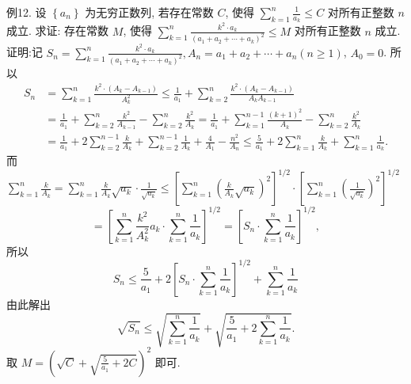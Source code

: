 例12. 设 $\left\{a_n\right\}$ 为无穷正数列, 若存在常数 $C$, 使得 $\sum_{k=1}^n \frac{1}{a_k} \leqslant C$ 对所有正整数 $n$ 成立.
求证: 存在常数 $M$, 使得 $\sum_{k=1}^n \frac{k^2 \cdot a_k}{\left(a_1+a_2+\cdots+a_k\right)^2} \leqslant M$ 对所有正整数 $n$ 成立.
证明:记 $S_n=\sum_{k=1}^n \frac{k^2 \cdot a_k}{\left(a_1+a_2+\cdots+a_k\right)^2}, A_n=a_1+a_2+\cdots+a_n(n \geqslant 1)$, $A_0=0$. 所以
$$
\begin{aligned}
S_n & =\sum_{k=1}^n \frac{k^2 \cdot\left(A_k-A_{k-1}\right)}{A_k^2} \leqslant \frac{1}{a_1}+\sum_{k=2}^n \frac{k^2 \cdot\left(A_k-A_{k-1}\right)}{A_k A_{k-1}} \\
& =\frac{1}{a_1}+\sum_{k=2}^n \frac{k^2}{A_{k-1}}-\sum_{k=2}^n \frac{k^2}{A_k}=\frac{1}{a_1}+\sum_{k=1}^{n-1} \frac{(k+1)^2}{A_k}-\sum_{k=2}^n \frac{k^2}{A_k} \\
& =\frac{1}{a_1}+2 \sum_{k=2}^{n-1} \frac{k}{A_k}+\sum_{k=2}^{n-1} \frac{1}{A_k}+\frac{4}{A_1}-\frac{n^2}{A_n} \leqslant \frac{5}{a_1}+2 \sum_{k=1}^n \frac{k}{A_k}+\sum_{k=1}^n \frac{1}{a_k} .
\end{aligned}
$$
而 $\sum_{k=1}^n \frac{k}{A_k}=\sum_{k=1}^n \frac{k}{A_k} \sqrt{a_k} \cdot \frac{1}{\sqrt{a_k}} \leqslant\left[\sum_{k=1}^n\left(\frac{k}{A_k} \sqrt{a_k}\right)^2\right]^{1 / 2} \cdot\left[\sum_{k=1}^n\left(\frac{1}{\sqrt{a_k}}\right)^2\right]^{1 / 2}$
$$
=\left[\sum_{k=1}^n \frac{k^2}{A_k^2} a_k \cdot \sum_{k=1}^n \frac{1}{a_k}\right]^{1 / 2}=\left[S_n \cdot \sum_{k=1}^n \frac{1}{a_k}\right]^{1 / 2},
$$
所以
$$
S_n \leqslant \frac{5}{a_1}+2\left[S_n \cdot \sum_{k=1}^n \frac{1}{a_k}\right]^{1 / 2}+\sum_{k=1}^n \frac{1}{a_k}
$$
由此解出
$$
\sqrt{S_n} \leqslant \sqrt{\sum_{k=1}^n \frac{1}{a_k}}+\sqrt{\frac{5}{a_1}+2 \sum_{k=1}^n \frac{1}{a_k}} .
$$
取 $M=\left(\sqrt{C}+\sqrt{\frac{5}{a_1}+2 C}\right)^2$ 即可.



